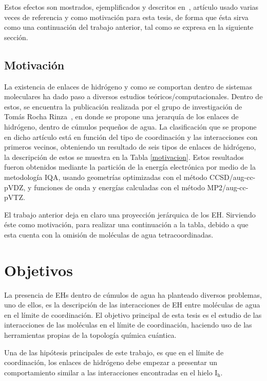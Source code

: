 Estos efectos son mostrados, ejemplificados y descritos en~,
artículo usado varias veces de referencia y como motivación para esta tesis, de
forma que ésta sirva como una continuación del trabajo anterior, tal como se
expresa en la siguiente sección.

\section{Motivación}

La existencia de enlaces de hidrógeno y como se comportan dentro de sistemas
moleculares ha dado paso a diversos estudios teóricos/computacionales.  Dentro
de estos, se encuentra la publicación realizada por el grupo de investigación
de Tomás Rocha Rinza~\cite{Toche2016}, en donde se propone una jerarquía de los
enlaces de hidrógeno, dentro de cúmulos pequeños de agua.  La clasificación que
se propone en dicho artículo está en función del tipo de coordinación y las
interacciones con primeros vecinos, obteniendo un resultado de seis tipos de
enlaces de hidrógeno, la descripción de estos se muestra en la Tabla
\ref{motivacion}. Estos resultados fueron obtenidos mediante la partición de la
energía electrónica por medio de la metodología IQA, usando geometrías
optimizadas con el método CCSD/aug-cc-pVDZ, y funciones de onda y energías
calculadas con el método MP2/aug-cc-pVTZ.

El trabajo anterior deja en claro una proyección jerárquica de los EH.
Sirviendo éste como motivación, para realizar una continuación a la
tabla, debido a que esta cuenta con la omisión de moléculas de agua
tetracoordinadas.

\chapter{Objetivos}

La presencia de EHs dentro de cúmulos de agua ha planteado diversos problemas,
uno de ellos, es la descripción de las interacciones de EH entre moléculas de
agua en el límite de coordinación. El objetivo principal de esta tesis es el
estudio de las interacciones de las moléculas en el límite de coordinación,
haciendo uso de las herramientas propias de la topología química cuántica. 

Una de las hipótesis principales de este trabajo, es que en el límite de
coordinación, los enlaces de hidrógeno debe empezar a presentar un
comportamiento similar a las interacciones encontradas en el hielo
$\mathrm{I_{h}}$.

